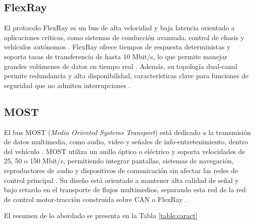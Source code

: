 \subsection{FlexRay}

El protocolo FlexRay es un bus de alta velocidad y baja latencia orientado a aplicaciones críticas, como sistemas de conducción avanzada, control de chasis y vehículos autónomos \citep{Navixy_AutomotiveBuses, Autoavance_FlexRay}. FlexRay ofrece tiempos de respuesta deterministas y soporta tasas de transferencia de hasta 10 Mbit/s, lo que permite manejar grandes volúmenes de datos en tiempo real \citep{MSG_CommunicationBuses}. Además, su topología dual‑canal permite redundancia y alta disponibilidad, características clave para funciones de seguridad que no admiten interrupciones \citep{Autoavance_FlexRay}.

\subsection{MOST}

El bus MOST (\textit{Media Oriented Systems Transport}) está dedicado a la transmisión de datos multimedia, como audio, video y señales de info‑entretenimiento, dentro del vehículo \citep{Navixy_AutomotiveBuses}. MOST utiliza un anillo óptico o eléctrico y soporta velocidades de 25, 50 o 150 Mbit/s, permitiendo integrar pantallas, sistemas de navegación, reproductores de audio y dispositivos de comunicación sin afectar las redes de control principal \citep{ProtocolosComunicacionAutomotriz}. Su diseño está orientado a mantener alta calidad de señal y bajo retardo en el transporte de flujos multimedios, separando esta red de la red de control motor‑tracción construida sobre CAN o FlexRay \citep{ProtocolosComunicacionAutomotriz}.

El resumen de lo abordado se presenta en la Tabla \ref{table:caract}


